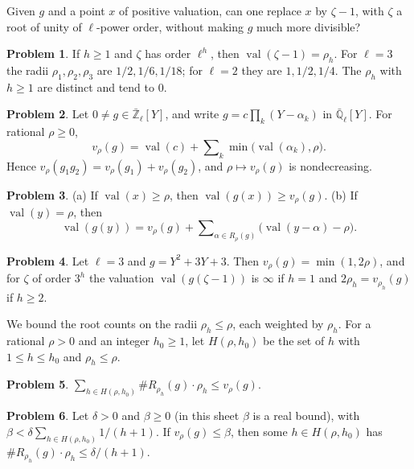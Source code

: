 \documentclass[reqno]{amsart}
\theoremstyle{definition}
\newtheorem{problem}{Problem}[section]
\theoremstyle{plain}
\newcommand{\Ql}{\bar{\mathbb{Q}}_\ell}
\newcommand{\Zl}{\bar{\mathbb{Z}}_\ell}
\newcommand{\val}{\operatorname{val}}
\begin{document}
Given \(g\) and a point \(x\) of positive valuation, can one replace \(x\) by \(\zeta - 1\), with \(\zeta\) a root of unity of \(\ell\)-power order, without making \(g\) much more divisible?

\begin{problem}\label{pr:radius}
If \(h \ge 1\) and \(\zeta\) has order \(\ell^h\), then \(\val(\zeta - 1) = \rho_h\).  For \(\ell = 3\) the radii \(\rho_1, \rho_2, \rho_3\) are \(1/2, 1/6, 1/18\); for \(\ell = 2\) they are \(1, 1/2, 1/4\).  The \(\rho_h\) with \(h \ge 1\) are distinct and tend to \(0\).
\end{problem}

\begin{problem}\label{pr:gauss}
Let \(0 \ne g \in \Zl[Y]\), and write \(g = c\prod_k (Y - \alpha_k)\) in \(\Ql[Y]\).  For rational \(\rho \ge 0\),
\[
  v_\rho(g) = \val(c) + \sum\nolimits_k \min\bigl(\val(\alpha_k), \rho\bigr).
\]
Hence \(v_\rho(g_1g_2) = v_\rho(g_1) + v_\rho(g_2)\), and \(\rho \mapsto v_\rho(g)\) is nondecreasing.
\end{problem}

\begin{problem}\label{pr:at-point}
\textup{(a)} If \(\val(x) \ge \rho\), then \(\val(g(x)) \ge v_\rho(g)\).
\textup{(b)} If \(\val(y) = \rho\), then
\[
  \val(g(y)) = v_\rho(g) + \sum\nolimits_{\alpha \in R_\rho(g)} \bigl(\val(y - \alpha) - \rho\bigr).
\]
\end{problem}

\begin{problem}\label{pr:example}
Let \(\ell = 3\) and \(g = Y^2 + 3Y + 3\).  Then \(v_\rho(g) = \min(1, 2\rho)\), and for \(\zeta\) of order \(3^h\) the valuation \(\val(g(\zeta - 1))\) is \(\infty\) if \(h = 1\) and \(2\rho_h = v_{\rho_h}(g)\) if \(h \ge 2\).
\end{problem}

We bound the root counts on the radii \(\rho_h \le \rho\), each weighted by \(\rho_h\).  For a rational \(\rho > 0\) and an integer \(h_0 \ge 1\), let \(H(\rho, h_0)\) be the set of \(h\) with \(1 \le h \le h_0\) and \(\rho_h \le \rho\).

\begin{problem}\label{pr:few-radii}
\(\sum_{h \in H(\rho, h_0)} \# R_{\rho_h}(g) \cdot \rho_h \le v_\rho(g)\).
\end{problem}

\begin{problem}\label{pr:pigeon}
Let \(\delta > 0\) and \(\beta \ge 0\) (in this sheet \(\beta\) is a real bound), with \(\beta < \delta \sum_{h \in H(\rho, h_0)} 1/(h + 1)\).  If \(v_\rho(g) \le \beta\), then some \(h \in H(\rho, h_0)\) has \(\# R_{\rho_h}(g) \cdot \rho_h \le \delta/(h + 1)\).
\end{problem}
\end{document}
